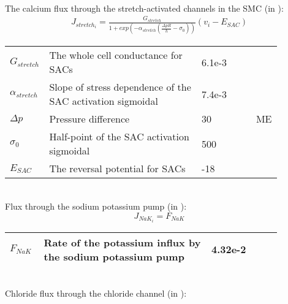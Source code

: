 \\
%
The calcium flux through the stretch-activated channels in the SMC (in \uMs): 
\begin{equation} \label{eq:Jstretchi}
\begin{split}
J_{stretch_{i}}= \frac{G_{stretch}}{1+ exp\left(-\alpha_{stretch}  \left(  \frac{\Delta pR}{h} -\sigma_{0}   \right) \right)}  \left(  v_{i}-E_{SAC}   \right) 
\end{split}
\end{equation}
%
\begin{table}[h!]
\centering
\begin{tabular}{| p{0.09\linewidth} | >{\footnotesize} p{0.57\linewidth} | >{\footnotesize} p{0.2\linewidth} | >{\footnotesize} p{0.02\linewidth} |}
\arrayrulecolor{lightgrey}\hline
$G_{stretch}$      		& The whole cell conductance for SACs						& 6.1e-3 \uMpmVs	&\cite{Koenigsberger2006} \\
$\alpha_{stretch}$      & Slope of stress dependence of the SAC activation sigmoidal	& 7.4e-3 \pmmHg	&\cite{Koenigsberger2006} \\
$ \Delta p $			& Pressure difference										& 30 \mmHg			& ME \\
$\sigma_{0}$      		& Half-point of the SAC activation sigmoidal				& 500 \mmHg			&\cite{Koenigsberger2006} \\
$E_{SAC}$      			& The reversal potential for SACs							& -18 \mV			&\cite{Koenigsberger2006} \\
\hline
\end{tabular}
\label{tab:Jstretchi}
\end{table}
\\
%
\newpage
Flux through the sodium potassium pump (in \uMs): 
\begin{equation} \label{eq:J_NaK_i}
J_{NaK_{i}}= F_{NaK}
\end{equation}
%
\begin{table}[h!]
\centering
\begin{tabular}{| p{0.09\linewidth} | >{\footnotesize} p{0.57\linewidth} | >{\footnotesize} p{0.2\linewidth} | >{\footnotesize} p{0.02\linewidth} |}
\arrayrulecolor{lightgrey}\hline
$F_{NaK}$      			& Rate of the potassium influx by the sodium potassium pump 		& 4.32e-2 \uMps 	&\cite{Koenigsberger2006} \\
\hline
\end{tabular}
\label{tab:JCli}
\end{table}
\\
Chloride flux through the chloride channel (in \uMs):
